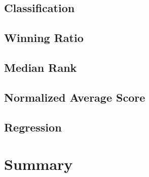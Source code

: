 \subsection{Classification}

\subsection{Winning Ratio}

\subsection{Median Rank}

\subsection{Normalized Average Score}

\subsection{Regression}

\section{Summary}

